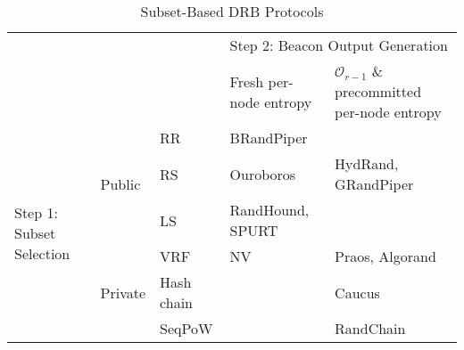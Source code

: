 \documentclass[letterpaper,twocolumn,10pt]{article}
\theoremstyle{definition}
\theoremstyle{remark}
\begin{document}
\begin{table*}[pt]
\caption{Subset-Based DRB Protocols}
\label{table:subset-based}
\begin{tabular}{@{}lllll@{}}
                                          &                          &            & \multicolumn{2}{l}{Step 2: Beacon Output Generation}                  \\
                                          &                          &            & Fresh per-node entropy & $\mathcal{O}_{r - 1}$ \& precommitted per-node entropy \\
\multirow{6}{*}{Step 1: Subset Selection} & \multirow{3}{*}{Public}  & RR         & BRandPiper             &                                              \\
                                          &                          & RS         & Ouroboros              & HydRand, GRandPiper                          \\
                                          &                          & LS         & RandHound, SPURT       &                                              \\
                                          & \multirow{3}{*}{Private} & VRF        & NV                     & Praos, Algorand                              \\
                                          &                          & Hash chain &                        & Caucus                                       \\
                                          &                          & SeqPoW     &                        & RandChain                                   
\end{tabular}
\end{table*}
\end{document}
